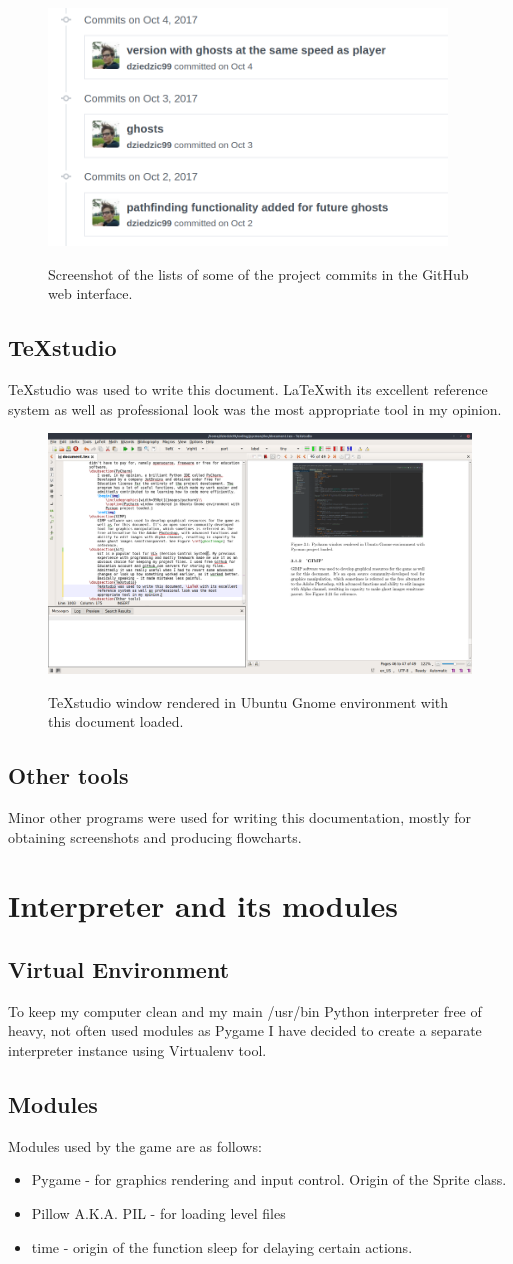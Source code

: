 \documentclass[11pt,a4paper,notitlepage]{report}
\newcommand{\dsubsection}[1]{\FloatBarrier \subsection{#1}}
\newenvironment{img}{
	\begin{center}
		\begin{figure}[H]
			\begin{center}
			
}{
	\end{center}
		\end{figure}
			\end{center}
}
\begin{document}
				\begin{img}
					\includegraphics[width=300pt]{images/github.png}\\
					\caption{Screenshot of the lists of some of the project commits in the GitHub web interface.}
				\end{img}
			\dsubsection{TeXstudio}
				TeXstudio was used to write this document. \LaTeX with its excellent reference system as well as professional look was the most appropriate tool in my opinion.
				\begin{img}
					\includegraphics[width=350pt]{images/texstudio}\\
					\caption{TeXstudio window rendered in Ubuntu Gnome environment with this document loaded.}
				\end{img}
			\dsubsection{Other tools}
				Minor other programs were used for writing this documentation, mostly for obtaining screenshots and producing flowcharts.
		\section{Interpreter and its modules}
			\dsubsection{Virtual Environment}
				To keep my computer clean and my main /usr/bin Python interpreter free of heavy, not often used modules as Pygame I have decided to create a separate interpreter instance using Virtualenv tool.
			\dsubsection{Modules}
				Modules used by the game are as follows:
				\begin{itemize}
					\item Pygame - for graphics rendering and input control. Origin of the Sprite class.
					\item Pillow A.K.A. PIL - for loading level files
					\item time - origin of the function sleep for delaying certain actions.
				\end{itemize}
\end{document}
